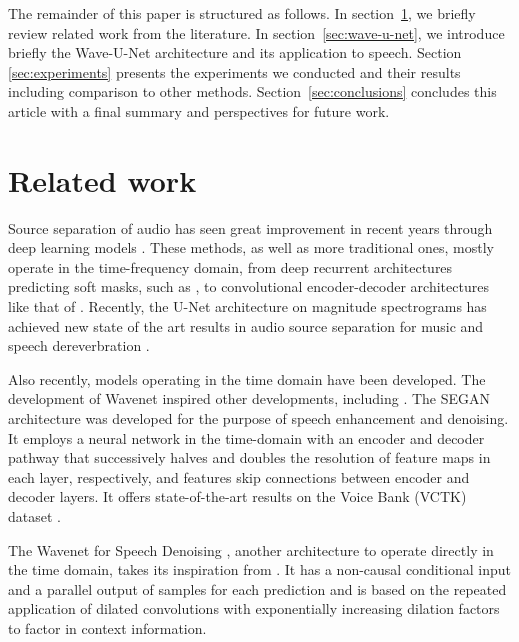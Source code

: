 \documentclass{article}
\begin{document}
The remainder of this paper is structured as follows. In section~\ref{sec:related}, we briefly review related work from the literature. 
In section~\ref{sec:wave-u-net}, we introduce briefly the Wave-U-Net architecture and its application to speech. 
Section \ref{sec:experiments} presents the experiments we conducted and their results including comparison to other methods. 
Section~\ref{sec:conclusions} concludes this article with a final summary and perspectives for future work.


\section{Related work}\label{sec:related}
Source separation of audio has seen great improvement in recent years through deep learning models  \citep{huang2015joint, nugraha2016multichannel}. 
These methods, as well as more traditional ones, mostly operate in the time-frequency domain, from deep recurrent architectures predicting soft masks, such as \citep{HuangSINGING-VOICENETWORKS}, to convolutional encoder-decoder architectures like that of \citep{Chandna2017MonoauralNetworks}.
Recently, the U-Net architecture on magnitude spectrograms has achieved new state of the art results in audio source separation for music \citep{Jansson-et-al-2017-Sining} and speech dereverbration \citep{Ori-et-al-2018-Speech-Dereverbration}. 

Also recently, models operating in the time domain have been developed.
The development of Wavenet \citep{Oord-et-al-2016-Wavenet} inspired other developments, including  \citep{Pascual2017, RethageADenoising}.
The SEGAN \citep{Pascual2017} architecture was developed for the purpose of speech enhancement and denoising. 
It employs a neural network in the time-domain with an encoder and decoder pathway that successively halves and doubles the resolution of feature maps in each layer, respectively, and features skip connections between encoder and decoder layers. 
It offers state-of-the-art results on the Voice Bank (VCTK) dataset \citep{Valentini-Botinhao2017Noisysound}.
















The Wavenet for Speech Denoising \citep{RethageADenoising}, another architecture to operate directly in the time domain, takes its inspiration from \citep{Oord-et-al-2016-Wavenet}. It has a non-causal conditional input and a parallel output of samples for each prediction and is based on the repeated application of dilated convolutions with exponentially increasing dilation factors to factor in context information.
\end{document}
